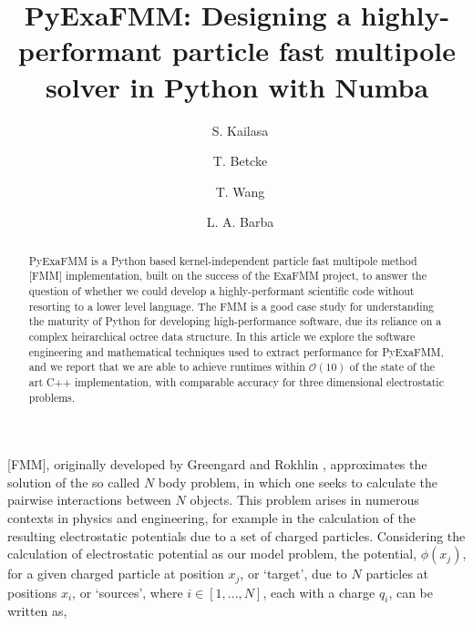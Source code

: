 \documentclass{IEEEcsmag}
\begin{document}

\title{PyExaFMM: Designing a highly-performant particle fast multipole solver in Python with Numba}

\author{\ S. Kailasa}

\author{\ T. Betcke}

\author{\ T. Wang}

\author{\ L. A. Barba}


\begin{abstract}
PyExaFMM is a Python based kernel-independent particle fast multipole method [FMM] implementation, built on the success of the ExaFMM project, to answer the question of whether we could develop a highly-performant scientific code without resorting to a lower level language. The FMM is a good case study for understanding the maturity of Python for developing high-performance software, due its reliance on a complex heirarchical octree data structure. In this article we explore the software engineering and mathematical techniques used to extract performance for PyExaFMM, and we report that we are able to achieve runtimes within $\mathcal{O}(10)$ of the state of the art C++ implementation, with comparable accuracy for three dimensional electrostatic problems.

\end{abstract}

\maketitle

 [FMM], originally developed by Greengard and Rokhlin \cite{Greengard1987}, approximates the solution of the so called $N$ body problem, in which one seeks to calculate the pairwise interactions between $N$ objects. This problem arises in numerous contexts in physics and engineering, for example in the calculation of the resulting electrostatic potentials due to a set of charged particles. Considering the calculation of electrostatic potential as our model problem, the potential, $\phi(x_j)$, for a given charged particle at position $x_j$, or `target', due to $N$ particles at positions $x_i$, or `sources', where $i \in [1, ..., N]$, each with a charge $q_i$, can be written as,
\end{document}
